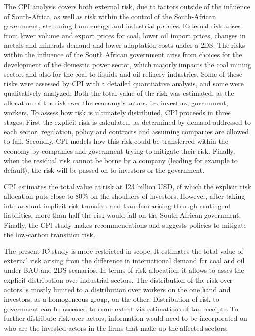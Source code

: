 \documentclass[12pt,english]{article}
\begin{document}
The CPI analysis covers both external risk, due to factors outside of the influence of South-Africa, as well as risk within the control of the South-African government, stemming from energy and industrial policies. External risk arises from lower volume and export prices for coal, lower oil import prices, changes in metals and minerals demand and lower adaptation costs under a 2DS.
The risks within the influence of the South African government arise from 
choices for the development of the domestic power sector, which majorly impacts the coal mining sector, and also for the coal-to-liquids and oil refinery industries. Some of these risks were assessed by CPI with a detailed quantitative analysis, and some were qualitatively analyzed. Both the total value of the risk was estimated, as the allocation of the risk over the economy's actors, i.e. investors, government, workers. To assess how risk is ultimately distributed, CPI proceeds in three stages. First the explicit risk is calculated, as determined by demand addressed to each sector, regulation, policy and contracts and assuming companies are allowed to fail. Secondly, CPI models how this risk could be transferred within the economy by companies and government trying to mitigate their risk. Finally, when the residual risk cannot be borne by a company (leading for example to default), the risk will be passed on to investors or the government. 

CPI estimates the total value at risk at 123 billion USD, of which the explicit risk allocation puts close to 80\% on the shoulders of investors. However, after taking into account implicit risk transfers and transfers arising through contingent liabilities, more than half the risk would fall on the South African government. Finally, the CPI study makes recommendations and suggests policies to mitigate the low-carbon transition risk.

The present IO study is more restricted in scope. It estimates the total value of external risk arising from the difference in international demand for coal and oil under BAU and 2DS scenarios. In terms of risk allocation, it allows to asses the explicit distribution over industrial sectors. The distribution of the risk over actors is mostly limited to a distribution over workers on the one hand and investors, as a homogeneous group, on the other. Distribution of risk to government can be assessed to some extent via estimations of tax receipts. To further distribute risk over actors, information would need to be incorporated on who are the invested actors in the firms that make up the affected sectors. 
\end{document}
